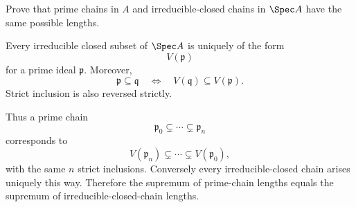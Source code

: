 \begin{problem}\label{prob:vi29-02}
Prove that prime chains in \(A\) and irreducible-closed chains in \(\Spec A\) have the same possible lengths.

\end{problem}

\ifdefined\FullProblemDossiers
\begin{solution}
Every irreducible closed subset of \(\Spec A\) is uniquely of the form
\[
V(\mathfrak p)
\]
for a prime ideal \(\mathfrak p\).  Moreover,
\[
\mathfrak p\subseteq\mathfrak q
\quad\Longleftrightarrow\quad
V(\mathfrak q)\subseteq V(\mathfrak p).
\]
Strict inclusion is also reversed strictly.

Thus a prime chain
\[
\mathfrak p_0\subsetneq\cdots\subsetneq\mathfrak p_n
\]
corresponds to
\[
V(\mathfrak p_n)\subsetneq\cdots\subsetneq V(\mathfrak p_0),
\]
with the same \(n\) strict inclusions.  Conversely every irreducible-closed chain arises uniquely this way.
Therefore the supremum of prime-chain lengths equals the supremum of irreducible-closed-chain lengths.
\end{solution}
\fi
